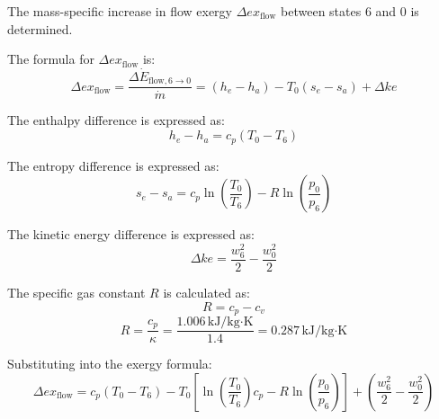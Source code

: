 The mass-specific increase in flow exergy \( \Delta ex_{\text{flow}} \) between states 6 and 0 is determined.  

The formula for \( \Delta ex_{\text{flow}} \) is:  
\[
\Delta ex_{\text{flow}} = \frac{\Delta \dot{E}_{\text{flow},6 \to 0}}{\dot{m}} = (h_e - h_a) - T_0 (s_e - s_a) + \Delta ke
\]  

The enthalpy difference is expressed as:  
\[
h_e - h_a = c_p (T_0 - T_6)
\]  

The entropy difference is expressed as:  
\[
s_e - s_a = c_p \ln \left( \frac{T_0}{T_6} \right) - R \ln \left( \frac{p_0}{p_6} \right)
\]  

The kinetic energy difference is expressed as:  
\[
\Delta ke = \frac{w_6^2}{2} - \frac{w_0^2}{2}
\]  

The specific gas constant \( R \) is calculated as:  
\[
R = c_p - c_v
\]  
\[
R = \frac{c_p}{\kappa} = \frac{1.006 \, \text{kJ/kg·K}}{1.4} = 0.287 \, \text{kJ/kg·K}
\]  

Substituting into the exergy formula:  
\[
\Delta ex_{\text{flow}} = c_p \left( T_0 - T_6 \right) - T_0 \left[ \ln \left( \frac{T_0}{T_6} \right) c_p - R \ln \left( \frac{p_0}{p_6} \right) \right] + \left( \frac{w_6^2}{2} - \frac{w_0^2}{2} \right)
\]